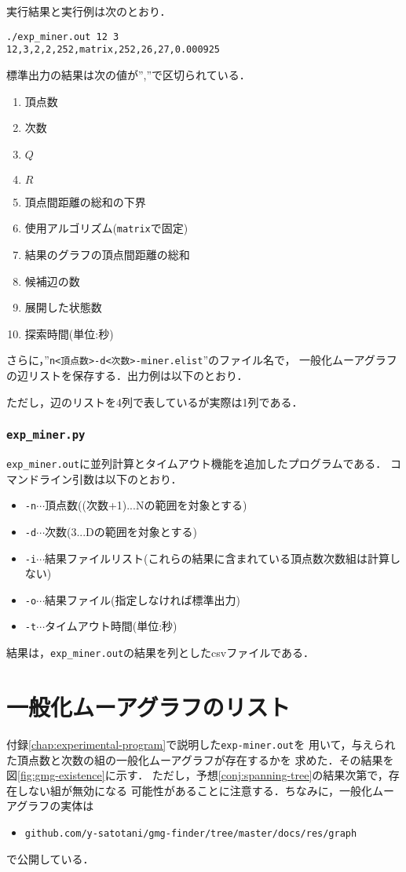 実行結果と実行例は次のとおり．
\begin{verbatim}
./exp_miner.out 12 3
12,3,2,2,252,matrix,252,26,27,0.000925
\end{verbatim}

標準出力の結果は次の値が'',''で区切られている．
\begin{enumerate}
\item 頂点数
\item 次数
\item $Q$
\item $R$
\item 頂点間距離の総和の下界
\item 使用アルゴリズム(\verb|matrix|で固定)
\item 結果のグラフの頂点間距離の総和
\item 候補辺の数
\item 展開した状態数
\item 探索時間(単位:秒)
\end{enumerate}

さらに，''\texttt{n<頂点数>-d<次数>-miner.elist}''のファイル名で，
一般化ムーアグラフの辺リストを保存する．出力例は以下のとおり．
\begin{multicols}{4}
  
\end{multicols}
ただし，辺のリストを4列で表しているが実際は1列である．

\subsection*{\texttt{exp\_miner.py}}
\texttt{exp\_miner.out}に並列計算とタイムアウト機能を追加したプログラムである．
コマンドライン引数は以下のとおり．
\begin{itemize}
\item \texttt{-n}$\cdots$頂点数((次数+1)...Nの範囲を対象とする)
\item \texttt{-d}$\cdots$次数(3...Dの範囲を対象とする)
\item \texttt{-i}$\cdots$結果ファイルリスト(これらの結果に含まれている頂点数次数組は計算しない)
\item \texttt{-o}$\cdots$結果ファイル(指定しなければ標準出力)
\item \texttt{-t}$\cdots$タイムアウト時間(単位:秒)
\end{itemize}
結果は，\texttt{exp\_miner.out}の結果を列としたcsvファイルである．

\chapter{一般化ムーアグラフのリスト}
\label{chap:list-of-gmg}
付録\ref{chap:experimental-program}で説明した\verb|exp-miner.out|を
用いて，与えられた頂点数と次数の組の一般化ムーアグラフが存在するかを
求めた．その結果を図\ref{fig:gmg-existence}に示す．
ただし，予想\ref{conj:spanning-tree}の結果次第で，存在しない組が無効になる
可能性があることに注意する．ちなみに，一般化ムーアグラフの実体は
\begin{itemize}
\item \verb|github.com/y-satotani/gmg-finder/tree/master/docs/res/graph|
\end{itemize}
で公開している．

